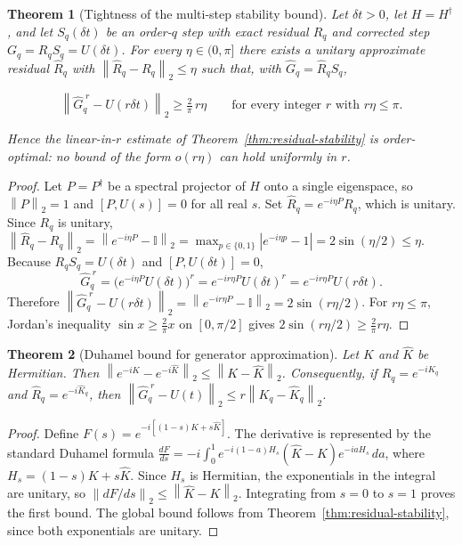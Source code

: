 \documentclass[aps,prxquantum,reprint,superscriptaddress,nofootinbib,amsmath,amssymb]{revtex4-2}
\newcommand{\norm}[1]{\left\lVert #1 \right\rVert}
\newcommand{\abs}[1]{\left\lvert #1 \right\rvert}
\newcommand{\id}{\mathbb{I}}
\newcommand{\dt}{\delta t}
\newtheorem{theorem}{Theorem}
\begin{document}
\begin{theorem}[Tightness of the multi-step stability bound]
\label{thm:stability-tight}
Let $\dt>0$, let $H=H^\dagger$, and let $S_q(\dt)$ be an order-$q$ step with exact residual $R_q$ and corrected step $G_q=R_qS_q=U(\dt)$. For every $\eta\in(0,\pi]$ there exists a \emph{unitary} approximate residual $\widehat R_q$ with $\norm{\widehat R_q-R_q}_2\leq\eta$ such that, with $\widehat G_q=\widehat R_qS_q$,
\begin{widetext}
\begin{equation}
    \norm{\widehat G_q^{\;r}-U(r\dt)}_2\geq\tfrac{2}{\pi}\,r\eta
    \qquad\text{for every integer } r \text{ with } r\eta\leq\pi.
    \label{eq:stability-tight}
\end{equation}
\end{widetext}
Hence the linear-in-$r$ estimate of Theorem~\ref{thm:residual-stability} is order-optimal: no bound of the form $o(r\eta)$ can hold uniformly in $r$.
\end{theorem}

\begin{proof}
Let $P=P^\dagger$ be a spectral projector of $H$ onto a single eigenspace, so $\norm{P}_2=1$ and $[P,U(s)]=0$ for all real $s$. Set $\widehat R_q=e^{-i\eta P}R_q$, which is unitary. Since $R_q$ is unitary, $\norm{\widehat R_q-R_q}_2=\norm{e^{-i\eta P}-\id}_2=\max_{p\in\{0,1\}}\abs{e^{-i\eta p}-1}=2\sin(\eta/2)\leq\eta$. Because $R_qS_q=U(\dt)$ and $[P,U(\dt)]=0$,
\begin{equation*}
    \widehat G_q^{\;r}=\bigl(e^{-i\eta P}U(\dt)\bigr)^r=e^{-ir\eta P}U(\dt)^r=e^{-ir\eta P}U(r\dt).
\end{equation*}
Therefore $\norm{\widehat G_q^{\;r}-U(r\dt)}_2=\norm{e^{-ir\eta P}-\id}_2=2\sin(r\eta/2)$. For $r\eta\leq\pi$, Jordan's inequality $\sin x\geq\frac{2}{\pi}x$ on $[0,\pi/2]$ gives $2\sin(r\eta/2)\geq\frac{2}{\pi}r\eta$.
\end{proof}

\begin{theorem}[Duhamel bound for generator approximation]
\label{thm:duhamel}
Let $K$ and $\widehat K$ be Hermitian. Then $\norm{e^{-iK}-e^{-i\widehat K}}_2\leq \norm{K-\widehat K}_2$. Consequently, if $R_q=e^{-iK_q}$ and $\widehat R_q=e^{-i\widehat K_q}$, then $\norm{\widehat G_q^{\;r}-U(t)}_2\leq r\norm{K_q-\widehat K_q}_2$.
\end{theorem}

\begin{proof}
Define $F(s)=e^{-i[(1-s)K+s\widehat K]}$. The derivative is represented by the standard Duhamel formula $\frac{dF}{ds}=-i\int_0^1 e^{-i(1-a)H_s}(\widehat K-K)e^{-iaH_s}\,da$, where $H_s=(1-s)K+s\widehat K$. Since $H_s$ is Hermitian, the exponentials in the integral are unitary, so $\norm{dF/ds}_2\leq\norm{\widehat K-K}_2$. Integrating from $s=0$ to $s=1$ proves the first bound. The global bound follows from Theorem~\ref{thm:residual-stability}, since both exponentials are unitary.
\end{proof}
\end{document}
